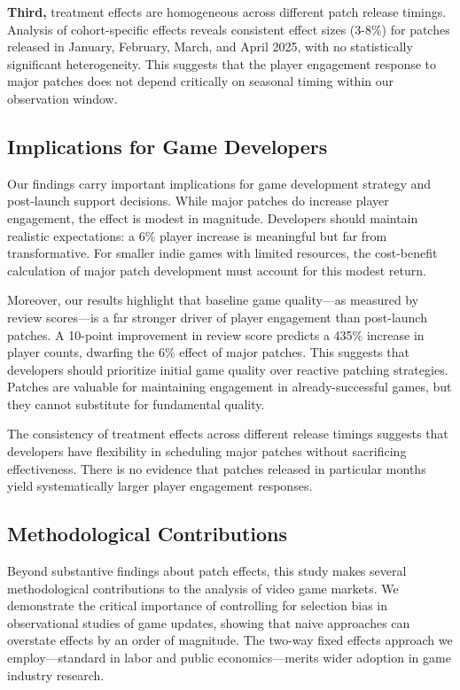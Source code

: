 \documentclass[12pt,a4paper]{article}
\begin{document}
\textbf{Third,} treatment effects are homogeneous across different patch release timings. Analysis of cohort-specific effects reveals consistent effect sizes (3-8\%) for patches released in January, February, March, and April 2025, with no statistically significant heterogeneity. This suggests that the player engagement response to major patches does not depend critically on seasonal timing within our observation window.

\subsection{Implications for Game Developers}

Our findings carry important implications for game development strategy and post-launch support decisions. While major patches do increase player engagement, the effect is modest in magnitude. Developers should maintain realistic expectations: a 6\% player increase is meaningful but far from transformative. For smaller indie games with limited resources, the cost-benefit calculation of major patch development must account for this modest return.

Moreover, our results highlight that baseline game quality---as measured by review scores---is a far stronger driver of player engagement than post-launch patches. A 10-point improvement in review score predicts a 435\% increase in player counts, dwarfing the 6\% effect of major patches. This suggests that developers should prioritize initial game quality over reactive patching strategies. Patches are valuable for maintaining engagement in already-successful games, but they cannot substitute for fundamental quality.

The consistency of treatment effects across different release timings suggests that developers have flexibility in scheduling major patches without sacrificing effectiveness. There is no evidence that patches released in particular months yield systematically larger player engagement responses.

\subsection{Methodological Contributions}

Beyond substantive findings about patch effects, this study makes several methodological contributions to the analysis of video game markets. We demonstrate the critical importance of controlling for selection bias in observational studies of game updates, showing that naive approaches can overstate effects by an order of magnitude. The two-way fixed effects approach we employ---standard in labor and public economics---merits wider adoption in game industry research.
\end{document}
